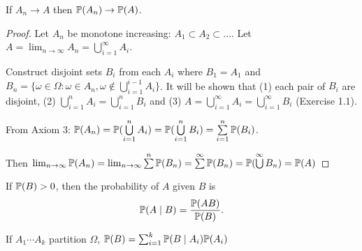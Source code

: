 \documentclass[10pt]{article}
\begin{document}
\begin{theorem}
If $A_n \to A$ then $\P(A_n) \to \P(A)$.
\end{theorem}

\begin{proof}
    Let $A_n$ be monotone increasing: $A_1 \subset A_2 \subset \dots$. Let
    $A = \lim_{n \to \infty} A_n = \bigcup_{i=1}^{\infty} A_i$.

    Construct disjoint sets $B_i$ from each $A_i$ where $B_1 = A_1$ and $B_n =
    \{ \omega \in \Omega : \omega \in A_n,\omega \notin \bigcup_{i=1}^{i-1}A_i \}$. It will be
    shown that (1) each pair of $B_i$ are disjoint, (2) $\bigcup_{i=1}^n A_i =
    \bigcup_{i=1}^n B_i$ and (3) $A = \bigcup_{i=1}^\infty A_i =
    \bigcup_{i=1}^\infty B_i$ (Exercise 1.1).

    From Axiom 3: $\P(A_n) = \P(\bigcup\limits_{i=1}^n A_i) = \P(\bigcup\limits_{i=1}^n B_i) =
    \sum\limits_{i=1}^n \P(B_i)$.

    Then $\lim_{n \to \infty} \P(A_n)
    = \lim_{n \to \infty} \sum\limits^{n}\P(B_n)
    = \sum\limits^{\infty}\P(B_n)
    = \P(\bigcup\limits^{\infty}B_n)
    = \P(A)$

\end{proof}

\begin{definition}
    If $\P(B) > 0$, then the probability of $A$ given $B$ is 
    \[\P(A \mid B) = \dfrac{\P(AB)}{\P(B)}.\]
\end{definition}

\begin{theorem}
    If $A_1 \cdots A_k$ partition $\Omega$, $\P(B) = \sum_{i=1}^k\P(B\mid A_i)\P(A_i)$
\end{theorem}
\end{document}
